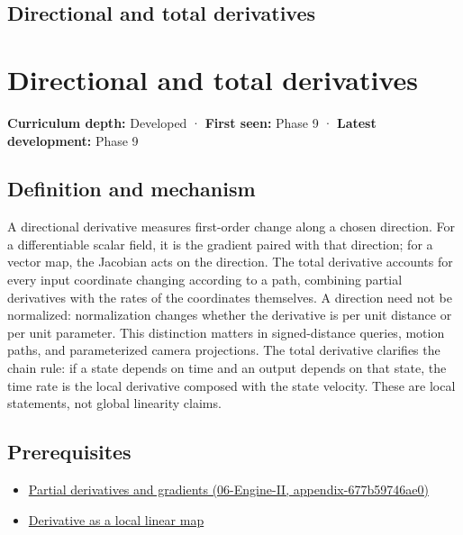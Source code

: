 \hypertarget{appendix-e2d476574aab}{}
\section*{Directional and total derivatives}
\chapter{Directional and total derivatives}\label{appendix-e2d476574aab-directional-and-total-derivatives}

\textbf{Curriculum depth:} Developed · \textbf{First seen:} Phase 9 · \textbf{Latest development:} Phase 9

\section{Definition and mechanism}\label{appendix-e2d476574aab-definition-and-mechanism}

A directional derivative measures first-order change along a chosen direction. For a differentiable scalar field, it is the gradient paired with that direction; for a vector map, the Jacobian acts on the direction. The total derivative accounts for every input coordinate changing according to a path, combining partial derivatives with the rates of the coordinates themselves. A direction need not be normalized: normalization changes whether the derivative is per unit distance or per unit parameter. This distinction matters in signed-distance queries, motion paths, and parameterized camera projections. The total derivative clarifies the chain rule: if a state depends on time and an output depends on that state, the time rate is the local derivative composed with the state velocity. These are local statements, not global linearity claims.

\section{Prerequisites}\label{appendix-e2d476574aab-prerequisites}

\begin{itemize}
\tightlist
\item
  \href{../06-Engine-II/main.pdf\#nameddest=appendix-677b59746ae0}{Partial derivatives and gradients (06-Engine-II, appendix-677b59746ae0)}
\item
  \hyperref[appendix-7bc181935c42]{Derivative as a local linear map}
\end{itemize}

